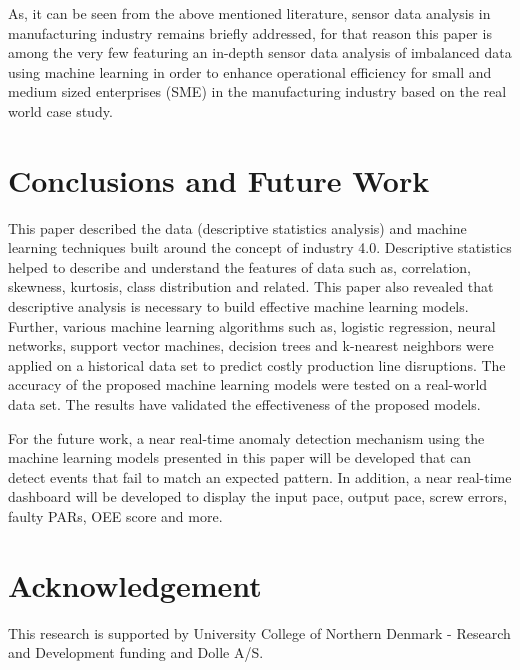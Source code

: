 \documentclass[runningheads]{llncs}
\begin{document}
As, it can be seen from the above mentioned literature, sensor data analysis in manufacturing industry remains briefly addressed, for that reason this paper is among the very few featuring an in-depth sensor data analysis of imbalanced data using machine learning in order to enhance operational efficiency for small and medium sized enterprises (SME) in the manufacturing industry based on the real world case study.

\section{Conclusions and Future Work}
\label{sec:conclusionandfuturework}
This paper described the data (descriptive statistics analysis) and machine learning techniques built around the concept of industry 4.0. Descriptive statistics helped to describe and understand the features of data such as, correlation, skewness, kurtosis, class distribution and related. This paper also revealed that descriptive analysis is necessary to build effective machine learning models. Further, various machine learning algorithms such as, logistic regression, neural networks, support vector machines, decision trees and k-nearest neighbors were applied on a historical data set to predict costly production line disruptions. The accuracy of the proposed machine learning models were tested on a real-world data set. The results have validated the effectiveness of the proposed models.

For the future work, a near real-time anomaly detection mechanism using the machine learning models presented in this paper will be developed that can detect events that fail to match an expected pattern. In addition, a near real-time dashboard will be developed to display the input pace, output pace, screw errors, faulty PARs, OEE score and more.



\section{Acknowledgement}
This  research is supported  by University College of Northern Denmark - Research and Development funding and Dolle A/S.
\end{document}
